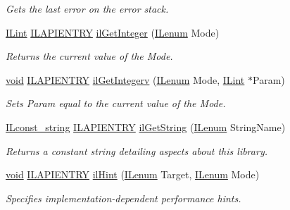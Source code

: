 \begin{DoxyCompactItemize}
\begin{DoxyCompactList}\small\item\em Gets the last error on the error stack. \end{DoxyCompactList}\item 
\hyperlink{group__il__types_ga8effe51a00daaa0878631e5af75a36cb}{I\+Lint} \hyperlink{_i_l_8h_a69c08a8d06df986f7e46f209d131ef2f}{I\+L\+A\+P\+I\+E\+N\+T\+R\+Y} \hyperlink{group__state_gac4d450b2397f016bbe00b0a0e4b53a0c}{il\+Get\+Integer} (\hyperlink{group__il__types_ga62ca73445716183ef42b1f3906a45ed0}{I\+Lenum} Mode)
\begin{DoxyCompactList}\small\item\em Returns the current value of the {\itshape Mode}. \end{DoxyCompactList}\item 
\hyperlink{_i_l_8h_a5530e04d947bcddd83639ea7940faf10}{void} \hyperlink{_i_l_8h_a69c08a8d06df986f7e46f209d131ef2f}{I\+L\+A\+P\+I\+E\+N\+T\+R\+Y} \hyperlink{group__state_ga4ed72709140871f480987a8c043ca4b8}{il\+Get\+Integerv} (\hyperlink{group__il__types_ga62ca73445716183ef42b1f3906a45ed0}{I\+Lenum} Mode, \hyperlink{group__il__types_ga8effe51a00daaa0878631e5af75a36cb}{I\+Lint} $\ast$Param)
\begin{DoxyCompactList}\small\item\em Sets {\itshape Param} equal to the current value of the {\itshape Mode}. \end{DoxyCompactList}\item 
\hyperlink{group__il__types_ga1aa1edc3eb344e14acacb02bade24a5a}{I\+Lconst\+\_\+string} \hyperlink{_i_l_8h_a69c08a8d06df986f7e46f209d131ef2f}{I\+L\+A\+P\+I\+E\+N\+T\+R\+Y} \hyperlink{group__state_ga29fd50e44b7e69435d64f82613438e4f}{il\+Get\+String} (\hyperlink{group__il__types_ga62ca73445716183ef42b1f3906a45ed0}{I\+Lenum} String\+Name)
\begin{DoxyCompactList}\small\item\em Returns a constant string detailing aspects about this library. \end{DoxyCompactList}\item 
\hyperlink{_i_l_8h_a5530e04d947bcddd83639ea7940faf10}{void} \hyperlink{_i_l_8h_a69c08a8d06df986f7e46f209d131ef2f}{I\+L\+A\+P\+I\+E\+N\+T\+R\+Y} \hyperlink{group__state_gad6f73e9f63ca905c29637f07e54cc604}{il\+Hint} (\hyperlink{group__il__types_ga62ca73445716183ef42b1f3906a45ed0}{I\+Lenum} Target, \hyperlink{group__il__types_ga62ca73445716183ef42b1f3906a45ed0}{I\+Lenum} Mode)
\begin{DoxyCompactList}\small\item\em Specifies implementation-\/dependent performance hints. \end{DoxyCompactList}\item 

\end{DoxyCompactItemize}
